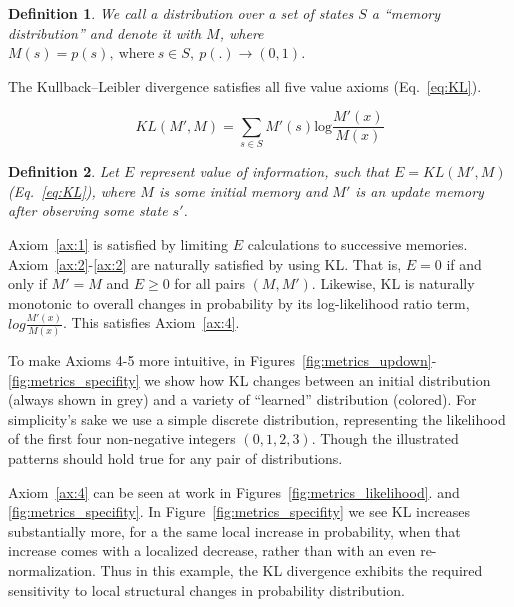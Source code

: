 \documentclass[9pt,twocolumn,twoside]{pnas-new}
\newtheorem{definition}{Definition}
\begin{document}
\begin{definition}
    We call a distribution over a set of states $S$ a ``memory distribution'' and denote it with $M$, where $M(s) = p(s), \ \text{where} \ s \in S, \ p(.) \rightarrow (0, 1)$.
\end{definition}

The Kullback--Leibler divergence satisfies all five value axioms (Eq.~\ref{eq:KL}). 

\begin{equation}
    KL(M', M) = \sum_{s \in S} M'(s) \text{log} \frac{M'(x)}{M(x)} 
    \label{eq:KL}
\end{equation}

\begin{definition}
    Let $E$ represent value of information, such that $E = KL(M', M)$ (Eq.~\ref{eq:KL}), where $M$ is some initial memory and $M'$ is an update memory after observing some state $s'$.
\end{definition}

Axiom~\ref{ax:1} is satisfied by limiting $E$ calculations to successive memories. Axiom~\ref{ax:2}-\ref{ax:2} are naturally satisfied by using KL. That is, $E = 0$ if and only if $M' = M$ and $E \geq 0$ for all pairs $(M, M')$. Likewise, KL is naturally monotonic to overall changes in probability by its log-likelihood ratio term, $log \frac{M'(x)}{M(x)}$. This satisfies Axiom~\ref{ax:4}. 

To make Axioms 4-5 more intuitive, in Figures~\ref{fig:metrics_updown}-\ref{fig:metrics_specifity} we show how KL changes between an initial distribution (always shown in grey) and a variety of ``learned'' distribution (colored). For simplicity's sake we use a simple discrete distribution, representing the likelihood of the first four non-negative integers $(0,1,2,3)$. Though the illustrated patterns should hold true for any pair of distributions.

Axiom~\ref{ax:4} can be seen at work in Figures~\ref{fig:metrics_likelihood}. and \ref{fig:metrics_specifity}. In Figure~\ref{fig:metrics_specifity} we see KL increases substantially more, for a the same local increase in probability, when that increase comes with a localized decrease, rather than with an even re-normalization. Thus in this example, the KL divergence exhibits the required sensitivity to local structural changes in probability distribution.
\end{document}
